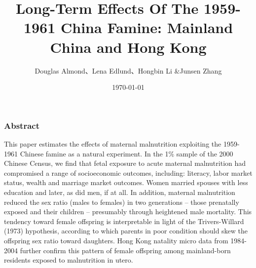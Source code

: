 \documentclass{beamer}
\title[文献分享:ZY]{Long-Term Effects Of The 1959-1961 China Famine: Mainland China and Hong Kong}
\author[Famine\_workshop]{Douglas Almond、Lena Edlund、Hongbin Li \&Junsen Zhang}
\date{\today}
\begin{document}
\frame{\titlepage}


\begin{frame}
	\frametitle{Abstract}
This paper estimates the effects of maternal malnutrition exploiting the 1959-1961 Chinese famine as a natural experiment. In the 1\% sample of the 2000 Chinese Census, we find that fetal exposure to acute maternal malnutrition had compromised a range of socioeconomic outcomes, including: literacy, labor market status, wealth and marriage market outcomes. Women married spouses with less education and later, as did men, if at all. In addition, maternal malnutrition reduced the sex ratio (males to females) in two generations -- those prenatally exposed and their children -- presumably through heightened male mortality. This tendency toward female offspring is interpretable in light of the Trivers-Willard (1973) hypothesis, according to which parents in poor condition should skew the offspring sex ratio toward daughters. Hong Kong natality micro data from 1984-2004 further confirm this pattern of female offspring among mainland-born residents exposed to malnutrition in utero.
\end{frame}
\end{document}
